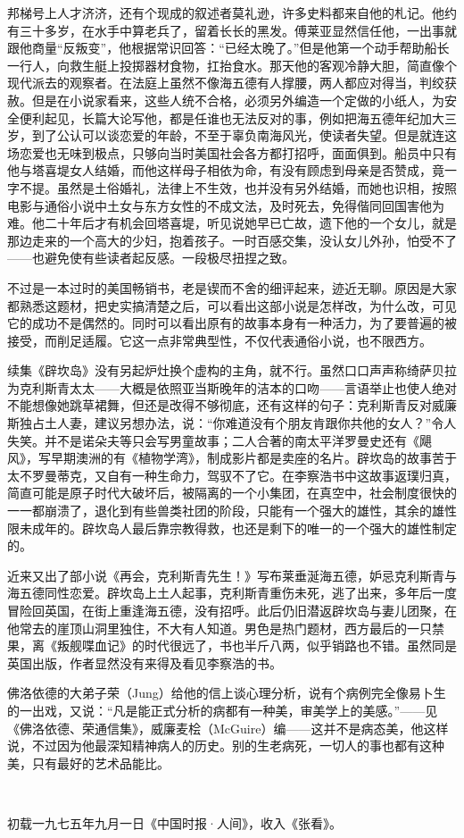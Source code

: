 \par 邦梯号上人才济济，还有个现成的叙述者莫礼逊，许多史料都来自他的札记。他约有三十多岁，在水手中算老兵了，留着长长的黑发。傅莱亚显然信任他，一出事就跟他商量“反叛变”，他根据常识回答：“已经太晚了。”但是他第一个动手帮助船长一行人，向救生艇上投掷器材食物，扛抬食水。那天他的客观冷静大胆，简直像个现代派去的观察者。在法庭上虽然不像海五德有人撑腰，两人都应对得当，判绞获赦。但是在小说家看来，这些人统不合格，必须另外编造一个定做的小纸人，为安全便利起见，长篇大论写他，都是任谁也无法反对的事，例如把海五德年纪加大三岁，到了公认可以谈恋爱的年龄，不至于辜负南海风光，使读者失望。但是就连这场恋爱也无味到极点，只够向当时美国社会各方都打招呼，面面俱到。船员中只有他与塔喜堤女人结婚，而他这样母子相依为命，有没有顾虑到母亲是否赞成，竟一字不提。虽然是土俗婚礼，法律上不生效，也并没有另外结婚，而她也识相，按照电影与通俗小说中土女与东方女性的不成文法，及时死去，免得偕同回国害他为难。他二十年后才有机会回塔喜堤，听见说她早已亡故，遗下他的一个女儿，就是那边走来的一个高大的少妇，抱着孩子。一时百感交集，没认女儿外孙，怕受不了——也避免使有些读者起反感。一段极尽扭捏之致。
\par 不过是一本过时的美国畅销书，老是锲而不舍的细评起来，迹近无聊。原因是大家都熟悉这题材，把史实搞清楚之后，可以看出这部小说是怎样改，为什么改，可见它的成功不是偶然的。同时可以看出原有的故事本身有一种活力，为了要普遍的被接受，而削足适履。它这一点非常典型性，不仅代表通俗小说，也不限西方。
\par 续集《辟坎岛》没有另起炉灶换个虚构的主角，就不行。虽然口口声声称绮萨贝拉为克利斯青太太——大概是依照亚当斯晚年的洁本的口吻——言语举止也使人绝对不能想像她跳草裙舞，但还是改得不够彻底，还有这样的句子：克利斯青反对威廉斯独占土人妻，建议另想办法，说：“你难道没有个朋友肯跟你共他的女人？”令人失笑。并不是诺朵夫等只会写男童故事；二人合著的南太平洋罗曼史还有《飓风》，写早期澳洲的有《植物学湾》，制成影片都是卖座的名片。辟坎岛的故事苦于太不罗曼蒂克，又自有一种生命力，驾驭不了它。在李察浩书中这故事返璞归真，简直可能是原子时代大破坏后，被隔离的一个小集团，在真空中，社会制度很快的一一都崩溃了，退化到有些兽类社团的阶段，只能有一个强大的雄性，其余的雄性限未成年的。辟坎岛人最后靠宗教得救，也还是剩下的唯一的一个强大的雄性制定的。
\par 近来又出了部小说《再会，克利斯青先生！》写布莱垂涎海五德，妒忌克利斯青与海五德同性恋爱。辟坎岛上土人起事，克利斯青重伤未死，逃了出来，多年后一度冒险回英国，在街上重逢海五德，没有招呼。此后仍旧潜返辟坎岛与妻儿团聚，在他常去的崖顶山洞里独住，不大有人知道。男色是热门题材，西方最后的一只禁果，离《叛舰喋血记》的时代很远了，书也半斤八两，似乎销路也不错。虽然同是英国出版，作者显然没有来得及看见李察浩的书。
\par 佛洛依德的大弟子荣（Jung）给他的信上谈心理分析，说有个病例完全像易卜生的一出戏，又说：“凡是能正式分析的病都有一种美，审美学上的美感。”——见《佛洛依德、荣通信集》，威廉麦桧（McGuire）编——这并不是病态美，他这样说，不过因为他最深知精神病人的历史。别的生老病死，一切人的事也都有这种美，只有最好的艺术品能比。
\par  
\par *初载一九七五年九月一日《中国时报·人间》，收入《张看》。



